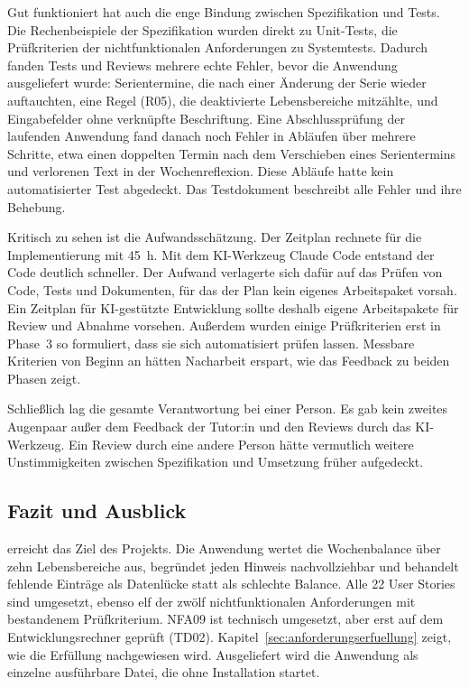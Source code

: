 Gut funktioniert hat auch die enge Bindung zwischen Spezifikation und Tests. Die Rechenbeispiele der Spezifikation wurden direkt zu Unit-Tests, die Prüfkriterien der nichtfunktionalen Anforderungen zu Systemtests. Dadurch fanden Tests und Reviews mehrere echte Fehler, bevor die Anwendung ausgeliefert wurde: Serientermine, die nach einer Änderung der Serie wieder auftauchten, eine Regel (R05), die deaktivierte Lebensbereiche mitzählte, und Eingabefelder ohne verknüpfte Beschriftung. Eine Abschlussprüfung der laufenden Anwendung fand danach noch Fehler in Abläufen über mehrere Schritte, etwa einen doppelten Termin nach dem Verschieben eines Serientermins und verlorenen Text in der Wochenreflexion. Diese Abläufe hatte kein automatisierter Test abgedeckt. Das Testdokument beschreibt alle Fehler und ihre Behebung.

Kritisch zu sehen ist die Aufwandsschätzung. Der Zeitplan rechnete für die Implementierung mit 45~h. Mit dem KI-Werkzeug Claude Code entstand der Code deutlich schneller. Der Aufwand verlagerte sich dafür auf das Prüfen von Code, Tests und Dokumenten, für das der Plan kein eigenes Arbeitspaket vorsah. Ein Zeitplan für KI-gestützte Entwicklung sollte deshalb eigene Arbeitspakete für Review und Abnahme vorsehen. Außerdem wurden einige Prüfkriterien erst in Phase~3 so formuliert, dass sie sich automatisiert prüfen lassen. Messbare Kriterien von Beginn an hätten Nacharbeit erspart, wie das Feedback zu beiden Phasen zeigt.

Schließlich lag die gesamte Verantwortung bei einer Person. Es gab kein zweites Augenpaar außer dem Feedback der Tutor:in und den Reviews durch das KI-Werkzeug. Ein Review durch eine andere Person hätte vermutlich weitere Unstimmigkeiten zwischen Spezifikation und Umsetzung früher aufgedeckt.

\subsection{Fazit und Ausblick}
\Projektname{} erreicht das Ziel des Projekts. Die Anwendung wertet die Wochenbalance über zehn Lebensbereiche aus, begründet jeden Hinweis nachvollziehbar und behandelt fehlende Einträge als Datenlücke statt als schlechte Balance. Alle 22 User Stories sind umgesetzt, ebenso elf der zwölf nichtfunktionalen Anforderungen mit bestandenem Prüfkriterium. NFA09 ist technisch umgesetzt, aber erst auf dem Entwicklungsrechner geprüft (TD02). Kapitel~\ref{sec:anforderungserfuellung} zeigt, wie die Erfüllung nachgewiesen wird. Ausgeliefert wird die Anwendung als einzelne ausführbare Datei, die ohne Installation startet.

